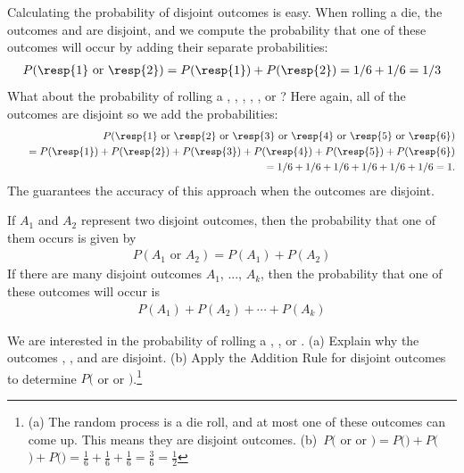 Calculating the probability of disjoint outcomes is easy. When rolling a die, the outcomes  and  are disjoint, and we compute the probability that one of these outcomes will occur by adding their separate probabilities:
\begin{eqnarray*}
P(\text{\resp{1} or \resp{2}}) = P(\text{\resp{1}})+P(\text{\resp{2}}) = 1/6 + 1/6 = 1/3
\end{eqnarray*}
What about  the probability of rolling a , , , , , or ? Here again, all of the outcomes are disjoint so we add the probabilities:
\begin{eqnarray*}
&&P(\text{\resp{1} or \resp{2} or \resp{3} or \resp{4} or \resp{5} or \resp{6}}) \\
	&&\quad= P(\text{\resp{1}})+P(\text{\resp{2}})+P(\text{\resp{3}})+P(\text{\resp{4}})+P(\text{\resp{5}})+P(\text{\resp{6}}) \\
	&&\quad= 1/6 + 1/6 + 1/6 + 1/6 + 1/6 + 1/6 = 1.
\end{eqnarray*}
The  guarantees the accuracy of this approach when the outcomes are disjoint. 

\begin{termBox}{ If $A_1$ and $A_2$ represent two disjoint outcomes, then the probability that one of them occurs is given by
\begin{eqnarray*}
P(A_1\text{ or } A_2) = P(A_1) + P(A_2)
\end{eqnarray*}
If there are many disjoint outcomes $A_1$, ..., $A_k$, then the probability that one of these outcomes will occur is
\begin{eqnarray}
P(A_1) + P(A_2) + \cdots + P(A_k)
\end{eqnarray}
}
\end{termBox}

\begin{exercise}
We are interested in the probability of rolling a , , or . (a) Explain why the outcomes , , and  are disjoint. (b) Apply the Addition Rule for disjoint outcomes to determine $P($ or  or $)$.\footnote{(a) The random process is a die roll, and at most one of these outcomes can come up. This means they are disjoint outcomes. (b)~$P($ or  or $) = P($$)+P($$)+P($$) = \frac{1}{6} + \frac{1}{6} + \frac{1}{6} = \frac{3}{6} = \frac{1}{2}$}
\end{exercise}


